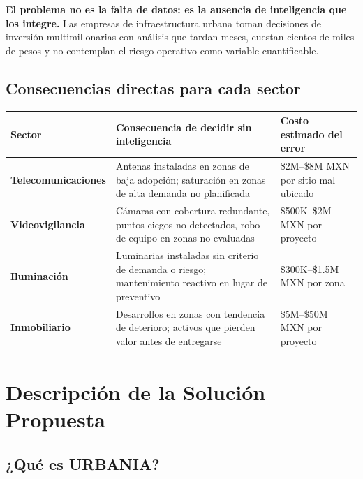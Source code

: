 \documentclass[12pt,a4paper]{article}
\begin{document}
\begin{tagline}
\textbf{El problema no es la falta de datos: es la ausencia de inteligencia que los integre.} Las empresas de infraestructura urbana toman decisiones de inversión multimillonarias con análisis que tardan meses, cuestan cientos de miles de pesos y no contemplan el riesgo operativo como variable cuantificable.
\end{tagline}

\subsection{Consecuencias directas para cada sector}

\begin{table}[H]
\centering
\small
\renewcommand{\arraystretch}{1.3}
\begin{tabularx}{\textwidth}{>{\bfseries}l X X}
\toprule
\rowcolor{grisoscuro}
\color{white}\textbf{Sector} & \color{white}\textbf{Consecuencia de decidir sin inteligencia} & \color{white}\textbf{Costo estimado del error} \\
\midrule
Telecomunicaciones & Antenas instaladas en zonas de baja adopción; saturación en zonas de alta demanda no planificada & \$2M–\$8M MXN por sitio mal ubicado \\
\rowcolor{fondofila}
Videovigilancia & Cámaras con cobertura redundante, puntos ciegos no detectados, robo de equipo en zonas no evaluadas & \$500K–\$2M MXN por proyecto \\
Iluminación & Luminarias instaladas sin criterio de demanda o riesgo; mantenimiento reactivo en lugar de preventivo & \$300K–\$1.5M MXN por zona \\
\rowcolor{fondofila}
Inmobiliario & Desarrollos en zonas con tendencia de deterioro; activos que pierden valor antes de entregarse & \$5M–\$50M MXN por proyecto \\
\bottomrule
\end{tabularx}
\end{table}


\newpage
\section{Descripción de la Solución Propuesta}

\subsection{¿Qué es URBANIA?}
\end{document}
